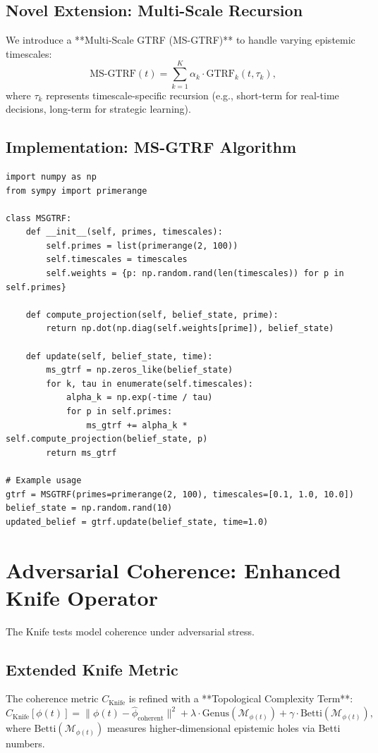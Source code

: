 \documentclass[12pt]{article}
\begin{document}
\subsection{Novel Extension: Multi-Scale Recursion}
We introduce a **Multi-Scale GTRF (MS-GTRF)** to handle varying epistemic timescales:
\[
\text{MS-GTRF}(t) = \sum_{k=1}^K \alpha_k \cdot \text{GTRF}_k(t, \tau_k),
\]
where $\tau_k$ represents timescale-specific recursion (e.g., short-term for real-time decisions, long-term for strategic learning).

\subsection{Implementation: MS-GTRF Algorithm}
\begin{verbatim}
import numpy as np
from sympy import primerange

class MSGTRF:
    def __init__(self, primes, timescales):
        self.primes = list(primerange(2, 100))
        self.timescales = timescales
        self.weights = {p: np.random.rand(len(timescales)) for p in self.primes}
    
    def compute_projection(self, belief_state, prime):
        return np.dot(np.diag(self.weights[prime]), belief_state)
    
    def update(self, belief_state, time):
        ms_gtrf = np.zeros_like(belief_state)
        for k, tau in enumerate(self.timescales):
            alpha_k = np.exp(-time / tau)
            for p in self.primes:
                ms_gtrf += alpha_k * self.compute_projection(belief_state, p)
        return ms_gtrf

# Example usage
gtrf = MSGTRF(primes=primerange(2, 100), timescales=[0.1, 1.0, 10.0])
belief_state = np.random.rand(10)
updated_belief = gtrf.update(belief_state, time=1.0)
\end{verbatim}

\section{Adversarial Coherence: Enhanced Knife Operator}
The Knife tests model coherence under adversarial stress.

\subsection{Extended Knife Metric}
The coherence metric $C_{\text{Knife}}$ is refined with a **Topological Complexity Term**:
\[
C_{\text{Knife}}[\phi(t)] = \|\phi(t) - \hat{\phi}_{\text{coherent}}\|^2 + \lambda \cdot \text{Genus}(\mathcal{M}_{\phi(t)}) + \gamma \cdot \text{Betti}(\mathcal{M}_{\phi(t)}),
\]
where $\text{Betti}(\mathcal{M}_{\phi(t)})$ measures higher-dimensional epistemic holes via Betti numbers.
\end{document}
